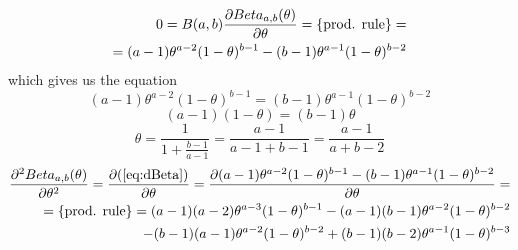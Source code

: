 \documentclass[a4paper,twoside=false,abstract=false,numbers=noenddot,
titlepage=false,headings=small,parskip=half,version=last]{scrartcl}
\begin{document}
\begin{solution}
    \begin{equation}
        \begin{split}
            \label{eq:dBeta}
            0=B(a,b)\frac{\partial{Beta_{a,b}(\theta)}}{\partial{\theta}}=\{\text{prod. rule}\}= \\
            =(a-1)\theta^{a-2}(1-\theta)^{b-1}-(b-1)\theta^{a-1}(1-\theta)^{b-2}
        \end{split}
    \end{equation}
    which gives us the equation
    \begin{equation}
        (a-1)\theta^{a-2}(1-\theta)^{b-1}=(b-1)\theta^{a-1}(1-\theta)^{b-2}
    \end{equation}
    \begin{equation}
        (a-1)(1-\theta)=(b-1)\theta 
    \end{equation}
    \begin{equation}
        \theta=\frac{1}{1+\frac{b-1}{a-1}}=
        \frac{a-1}{a-1+b-1}=\frac{a-1}{a+b-2} 
    \end{equation}
    \begin{equation}
        \begin{split}
            \frac{\partial^2{
                Beta_{a,b}(\theta)
            }}{\partial{
                \theta
            }^2}=
            \frac{\partial{
                (\eqref{eq:dBeta})
            }}{\partial{
                \theta
            }}=
            \frac{\partial{
                (a-1)\theta^{a-2}(1-\theta)^{b-1}-
                (b-1)\theta^{a-1}(1-\theta)^{b-2}
            }}{\partial{
                \theta
            }}= \\
            =\{\text{prod. rule}\}=
              (a-1)(a-2)\theta^{a-3}(1-\theta)^{b-1}
             -(a-1)(b-1)\theta^{a-2}(1-\theta)^{b-2} \\
             -(b-1)(a-1)\theta^{a-2}(1-\theta)^{b-2}
             +(b-1)(b-2)\theta^{a-1}(1-\theta)^{b-3}  
        \end{split}
    \end{equation}


\end{solution}
\end{document}
